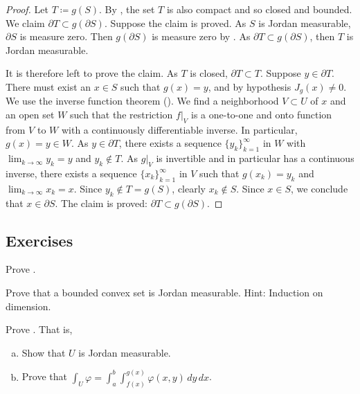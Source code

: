 \begin{proof}
Let $T \coloneqq g(S)$.  %
By 
,
the set
$T$ is also compact and so closed and bounded.
We claim $\partial T \subset g(\partial S)$.  Suppose the claim is proved.
As $S$ is Jordan measurable,
$\partial S$ is measure zero.  Then  $g(\partial S)$ is measure
zero by .  As $\partial T \subset g(\partial
S)$, then $T$ is Jordan measurable.

It is therefore left to prove the claim.
As $T$ is closed, $\partial T \subset T$.
Suppose $y \in \partial T$.  There must exist an
$x \in S$
such that $g(x) = y$, and by hypothesis $J_g(x) \neq 0$.
We use the inverse function theorem ().  We find 
a neighborhood $V \subset U$ of $x$ and an open set $W$ such that
the restriction $f|_V$ is a one-to-one and onto function from $V$ to $W$
with a continuously differentiable inverse.  In particular, $g(x) = y \in W$.
As $y \in \partial T$, there exists a sequence $\{ y_k \}_{k=1}^\infty$ in $W$ with
$\lim_{k\to\infty} y_k = y$ and $y_k \notin T$.  As $g|_V$ is invertible and in
particular has a continuous inverse, there exists
a sequence $\{ x_k \}_{k=1}^\infty$ in $V$ such that $g(x_k) = y_k$ and
$\lim_{k\to\infty} x_k = x$.
Since $y_k \notin T = g(S)$, clearly $x_k \notin S$.  Since $x \in S$, we
conclude that $x \in \partial S$.  The claim is proved: $\partial T \subset
g(\partial S)$.
\end{proof}

\subsection{Exercises}

\begin{exercise}
Prove .
\end{exercise}

\begin{exercise}
Prove that a bounded convex set is Jordan measurable.  Hint: Induction on
dimension.
\end{exercise}

\begin{exercise} \label{exercise:intovertypeIset}
Prove .  That is,
\begin{enumerate}[a)]
\item
Show that $U$ is Jordan measurable.
\item
Prove that
$\int_U \varphi =
\int_a^b \int_{f(x)}^{g(x)} \varphi(x,y) \, dy \, dx$.
\end{enumerate}
\end{exercise}

